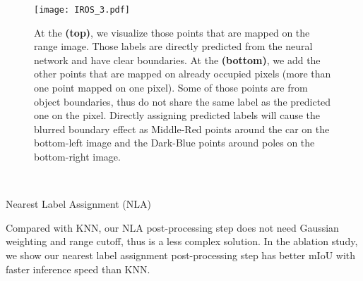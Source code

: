 \documentclass[letterpaper, 10 pt, conference]{ieeeconf}
\providecommand{\SetAlgoLined}{\SetLine}
\begin{document}
\begin{figure}
 \centering
\texttt{[image: IROS\_3.pdf]}
    \caption{ At the \textbf{(top)}, we visualize those points that are mapped on the range image. Those labels are directly predicted from the neural network and have clear boundaries. At the \textbf{(bottom)}, we add the other points that are mapped on already occupied pixels (more than one point mapped on one pixel). Some of those points are from object boundaries, thus do not share the same label as the predicted one on the pixel. Directly assigning predicted labels will cause the blurred boundary effect as Middle-Red points around the car on the bottom-left image and the Dark-Blue points around poles on the bottom-right image. }
    \label{fig:fourth}
    \vspace{-3mm}
\end{figure}


\begin{algorithm}[H]
	\SetAlgoLined
	\BlankLine
	\\ 
\Return{}
	\caption{Nearest Label Assignment (NLA)}\label{alg:NLA}
\end{algorithm}

Compared with KNN, our NLA post-processing step does not need Gaussian weighting and range cutoff, thus is a less complex solution. In the ablation study, we show our nearest label assignment post-processing step has better mIoU with faster inference speed than KNN. 
\end{document}
